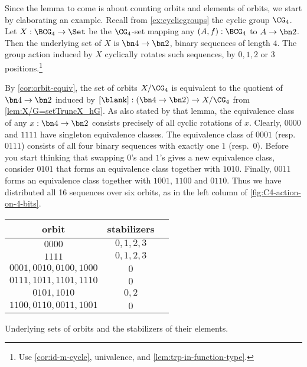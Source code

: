 \begin{example}\label{exa:prep-burnside}
Since the lemma to come is about counting orbits and
elements of orbits, we start by elaborating an example.
Recall from \cref{ex:cyclicgroups} the cyclic group $\CG_4$.
Let $X: \BCG_4\to\Set$ be the $\CG_4$-set mapping any $(A,f):\BCG_4$
to $A\to\bn2$. Then the underlying set of $X$ is $\bn4\to\bn2$,
\ie binary sequences of length $4$. The group action induced by $X$
cyclically rotates such sequences, by $0,1,2$ or $3$ positions.\footnote{%
Use \cref{cor:id-m-cycle}, univalence, and \cref{lem:trp-in-function-type}.}

By \cref{cor:orbit-equiv}, the set of orbits $X/\CG_4$ is
equivalent to the quotient of $\bn4\to\bn2$ induced by 
$[\blank] : (\bn4\to\bn2) \to X/\CG_4$ from \cref{lem:X/G=setTruncX_hG}.
As also stated by that lemma, the equivalence class of any $x:\bn4\to\bn2$
consists precisely of all cyclic rotations of $x$. Clearly, 
$0000$ and $1111$ have singleton equivalence classes.
The equivalence class of $0001$ (resp.\ $0111$) consists of all four binary 
sequences with exactly one $1$ (resp.\ $0$).  Before you start thinking that
swapping $0$'s and $1$'s gives a new equivalence class, consider 
$0101$ that forms an equivalence class together with $1010$.
Finally, $0011$ forms an equivalence class together with $1001$,
$1100$ and $0110$. Thus we have distributed all 16 sequences over
six orbits, as in the left column of \cref{fig:C4-action-on-4-bits}.

\begin{margintable}\label{fig:C4-action-on-4-bits}
  \footnotesize
\begin{tabular}{ccc} \toprule
 orbit & stabilizers \\ \midrule
 $0000$ & $0,1,2,3$ \\
 $1111$ & $0,1,2,3$ \\
 $0001,0010,0100,1000$ & $0$ \\
 $0111,1011,1101,1110$ & $0$ \\
 $0101,1010$ & $0,2$ \\
 $1100,0110,0011,1001$ & $0$ \\ \bottomrule
\end{tabular}
\caption{\label{fig:C4-action-on-4-bits}
Underlying sets of orbits and the stabilizers of their elements.}
\end{margintable}


\end{example}
